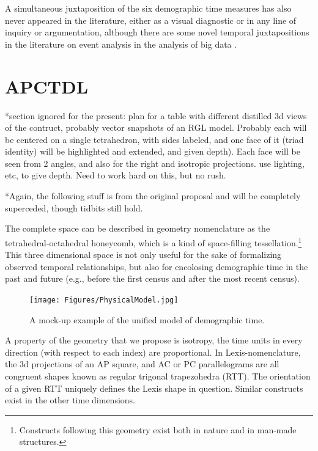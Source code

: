 \documentclass[11pt,oneside,a4paper]{article} %
\begin{document}
A simultaneous juxtaposition of the six demographic time measures has also never
appeared in the literature, either as a visual diagnostic or in any line of
inquiry or argumentation, although there are some novel temporal
juxtapositions in the literature on event analysis in the analysis of
big data \citep[see e.g.,]{watson2015timemaps}.

 \section*{APCTDL}
*section ignored for the present: plan for a table with different distilled 3d
views of the contruct, probably vector snapshots of an RGL model. Probably each
will be centered on a single tetrahedron, with sides labeled, and one face of
it (triad identity) will be highlighted and extended, and given depth). Each
face will be seen from 2 angles, and also for the right and isotropic
projections. use lighting, etc, to give depth. Need to work hard on this, but no
rush.

*Again, the following stuff is from the original proposal and will be completely
superceded, though tidbits still hold.

The complete space can be described in
geometry nomenclature as the tetrahedral-octahedral honeycomb, which is a kind of space-filling tessellation.\footnote{Constructs following
this geometry exist both in nature and in man-made structures.} 
 This three dimensional space is not only useful for the sake of formalizing observed temporal relationships, but also for encolosing
demographic time in the past and future (e.g., before the first census and after
the most recent census). 

\begin{figure}[!h]
\centering
\caption[cap]{A mock-up example of the unified model of demographic
time.\footnotemark}
\label{fig:APCT}
	\texttt{[image: Figures/PhysicalModel.jpg]}
\end{figure}

A property of the geometry that we propose is isotropy,
the time units in every direction (with respect to each index) are proportional.
In Lexis-nomenclature, the 3d projections of an AP square, and AC or PC
parallelograms are all congruent shapes known as regular trigonal trapezohedra
(RTT). The orientation
of a given RTT uniquely defines the Lexis shape in question. Similar constructs
exist in the other time dimensions. 
\end{document}
